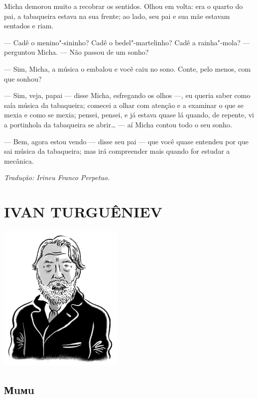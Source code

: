 Micha demorou muito a recobrar os sentidos. Olhou em volta: era o quarto
do pai, a tabaqueira estava na sua frente; ao lado, seu pai e sua mãe
estavam sentados e riam.

--- Cadê o menino"-sininho? Cadê o bedel"-martelinho? Cadê a rainha"-mola?
--- perguntou Micha. --- Não passou de um sonho?

--- Sim, Micha, a música o embalou e você caiu no sono. Conte, pelo
menos, com que sonhou?

--- Sim, veja, papai --- disse Micha, esfregando os olhos ---, eu queria
saber como saía música da tabaqueira; comecei a olhar com atenção e a
examinar o que se mexia e como se mexia; pensei, pensei, e já estava
quase lá quando, de repente, vi a portinhola da tabaqueira se abrir\ldots{}
--- aí Micha contou todo o seu sonho.

--- Bem, agora estou vendo --- disse seu pai --- que você quase entendeu
por que sai música da tabaqueira; mas irá compreender mais quando for
estudar a mecânica.

\medskip

{\footnotesize\hfill\emph{Tradução: Irineu Franco Perpetuo.}}


\part[IVAN TURGUÊNIEV]{IVAN TURGUÊNIEV }

\pagebreak
\thispagestyle{empty}
\mbox{}
\vfill
\begin{center}
\includegraphics[width=6cm]{./imgs/autor3.jpg}
\end{center}

\chapter{Мuмu} \label{part3}



